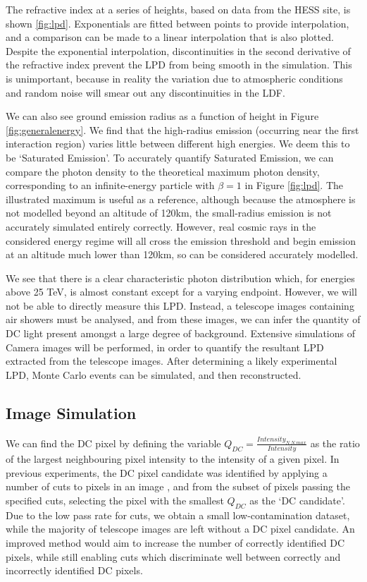 \documentclass[11pt]{article}
\begin{document}
The refractive index at a series of heights, based on data from the HESS site, is shown \ref{fig:lpd}. Exponentials are fitted between points to provide interpolation, and a comparison can be made to a linear interpolation that is also plotted. Despite the exponential interpolation, discontinuities in the second derivative of the refractive index prevent the LPD from being smooth in the simulation. This is unimportant, because in reality the variation due to atmospheric conditions and random noise will smear out any discontinuities in the LDF.

We can also see ground emission radius as a function of height in Figure \ref{fig:generalenergy}. We find that the high-radius emission (occurring near the first interaction region) varies little between different high energies. We deem this to be \textquoteleft Saturated Emission\textquoteright. To accurately quantify Saturated Emission, we can compare the photon density to the theoretical maximum photon density, corresponding to an infinite-energy particle with $\beta =1$ in Figure \ref{fig:lpd}. The illustrated maximum is useful as a reference, although because the atmosphere is not modelled beyond an altitude of 120km, the small-radius emission is not accurately simulated entirely correctly. However, real cosmic rays in the considered energy regime will all cross the emission threshold and begin emission at an altitude much lower than 120km, so can be considered accurately modelled.

We see that there is a clear characteristic photon distribution which, for energies above 25 TeV, is almost constant except for a varying endpoint. However, we will not be able to directly measure this LPD. Instead, a telescope images containing air showers must be analysed, and from these images, we can infer the quantity of DC light present amongst a large degree of background. Extensive simulations of Camera images will be performed, in order to quantify the resultant LPD extracted from the telescope images. After determining a likely experimental LPD, Monte Carlo events can be simulated, and then reconstructed. 

\subsection{Image Simulation}
We can find the DC pixel by defining the variable $Q_{DC} = \frac{Intensity_{N.N.max}}{Intensity}$ as the ratio of the largest neighbouring pixel intensity to the intensity of a given pixel. In previous experiments, the DC pixel candidate was identified by applying a number of cuts to pixels in an image \cite{hess07}, and from the subset of pixels passing the specified cuts, selecting the pixel with the smallest $Q_{DC}$ as the \textquoteleft DC candidate'. Due to the low pass rate for cuts, we obtain a small low-contamination dataset, while the majority of telescope images are left without a DC pixel candidate. An improved method would aim to increase the number of correctly identified DC pixels, while still enabling cuts which discriminate well between correctly and incorrectly identified DC pixels.
\end{document}
